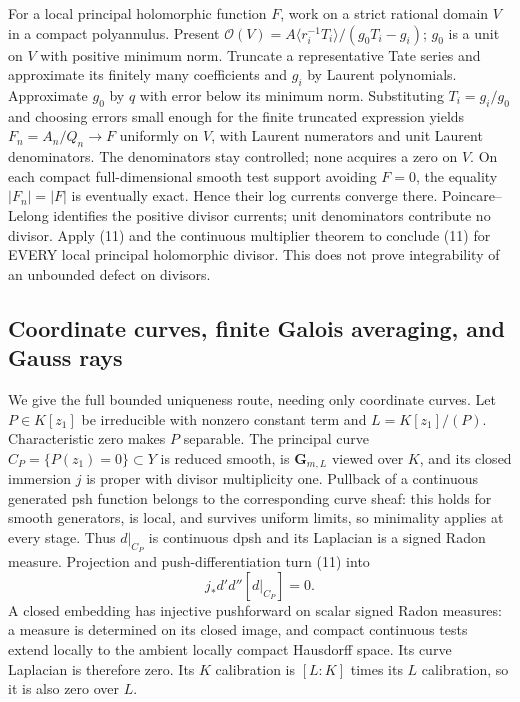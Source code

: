For a local principal holomorphic function $F$, work on a strict rational
domain $V$ in a compact polyannulus. Present
$\mathcal O(V)=A\langle r_i^{-1}T_i\rangle/(g_0T_i-g_i)$;
$g_0$ is a unit on $V$ with positive minimum norm.
Truncate a representative Tate series and approximate its finitely many
coefficients and $g_i$ by Laurent polynomials. Approximate $g_0$ by $q$
with error below its minimum norm. Substituting $T_i=g_i/g_0$ and choosing
errors small enough for the finite truncated expression yields
$F_n=A_n/Q_n\to F$ uniformly on $V$, with Laurent numerators and unit
Laurent denominators. The denominators stay controlled; none acquires a
zero on $V$. On each compact full-dimensional smooth test support avoiding
$F=0$, the equality $|F_n|=|F|$ is eventually exact. Hence their log currents
converge there. Poincare--Lelong identifies the positive divisor currents;
unit denominators contribute no divisor. Apply (11) and the continuous
multiplier theorem to conclude (11) for EVERY local principal holomorphic
divisor. This does not prove integrability of an unbounded defect on divisors.

\subsection{Coordinate curves, finite Galois averaging, and Gauss rays}
We give the full bounded uniqueness route, needing only coordinate curves.
Let $P\in K[z_1]$ be irreducible with nonzero constant term and
$L=K[z_1]/(P)$. Characteristic zero makes $P$ separable. The principal
curve $C_P=\{P(z_1)=0\}\subset Y$ is reduced smooth, is $\mathbf G_{m,L}$
viewed over $K$, and its closed immersion $j$ is proper with divisor
multiplicity one. Pullback of a continuous generated psh function belongs to
the corresponding curve sheaf: this holds for smooth generators, is local,
and survives uniform limits, so minimality applies at every stage.
Thus $d|_{C_P}$ is continuous dpsh and its Laplacian is a signed Radon
measure. Projection and push-differentiation turn (11) into
\[
 j_*d'd''[d|_{C_P}]=0.
\]
A closed embedding has injective pushforward on scalar signed Radon measures:
a measure is determined on its closed image, and compact continuous tests
extend locally to the ambient locally compact Hausdorff space.
Its curve Laplacian is therefore zero. Its $K$ calibration is $[L:K]$
times its $L$ calibration, so it is also zero over $L$.

